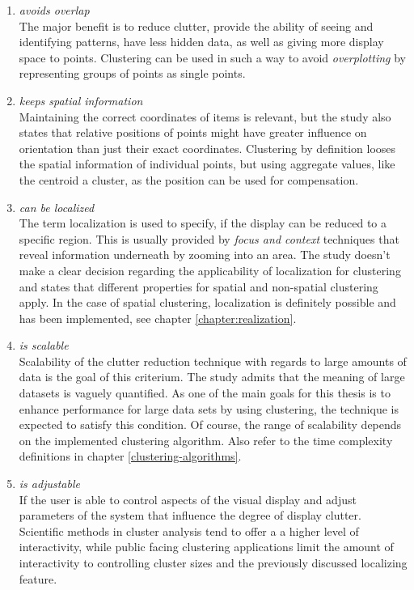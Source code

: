 \begin{enumerate}

\item \textit{avoids overlap}
\\ The major benefit is to reduce clutter, provide the ability of seeing and identifying patterns, have less hidden data, as well as giving more display space to points. Clustering can be used in such a way to avoid \textit{overplotting} by representing groups of points as single points.

\item \textit{keeps spatial information}
\\ Maintaining the correct coordinates of items is relevant, but the study also states that relative positions of points might have greater influence on orientation than just their exact coordinates. Clustering by definition looses the spatial information of individual points, but using aggregate values, like the centroid a cluster, as the position can be used for compensation. 

\item \textit{can be localized}
\\ The term localization is used to specify, if the display can be reduced to a specific region. This is usually provided by \textit{focus and context} techniques that reveal information underneath by zooming into an area. The study doesn't make a clear decision regarding the applicability of localization for clustering and states that different properties for spatial and non-spatial clustering apply. In the case of spatial clustering, localization is definitely possible and has been implemented, see chapter \ref{chapter:realization}.  

\item \textit{is scalable}
\\ Scalability of the clutter reduction technique with regards to large amounts of data is the goal of this criterium. The study admits that the meaning of large datasets is vaguely quantified. As one of the main goals for this thesis is to enhance performance for large data sets by using clustering, the technique is expected to satisfy this condition. Of course, the range of scalability depends on the implemented clustering algorithm. Also refer to the time complexity definitions in chapter \ref{clustering-algorithms}. 

\item \textit{is adjustable}
\\ If the user is able to control aspects of the visual display and adjust parameters of the system that influence the degree of display clutter. Scientific methods in cluster analysis tend to offer a a higher level of interactivity, while public facing clustering applications limit the amount of interactivity to controlling cluster sizes and the previously discussed localizing feature. 


\end{enumerate}
